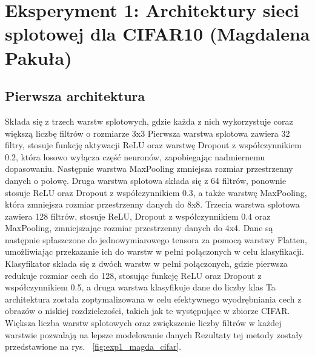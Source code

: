 \documentclass[10pt]{article}
\begin{document}
\pagebreak
\section{Eksperyment 1: Architektury sieci splotowej dla CIFAR10 (Magdalena Pakuła)}\label{sec:ex1-pakula_cifar}

\subsection*{Pierwsza architektura}
Składa się z trzech warstw splotowych, gdzie każda z nich wykorzystuje coraz większą liczbę filtrów o rozmiarze 3x3
Pierwsza warstwa splotowa zawiera 32 filtry, stosuje funkcję aktywacji ReLU oraz warstwę Dropout z współczynnikiem 0.2, która losowo wyłącza część neuronów, zapobiegając nadmiernemu dopasowaniu. Następnie warstwa MaxPooling zmniejsza rozmiar przestrzenny danych o połowę. Druga warstwa splotowa składa się z 64 filtrów, ponownie stosuje ReLU oraz Dropout z współczynnikiem 0.3, a także warstwę MaxPooling, która zmniejsza rozmiar przestrzenny danych do 8x8. Trzecia warstwa splotowa zawiera 128 filtrów, stosuje ReLU, Dropout z współczynnikiem 0.4 oraz MaxPooling, zmniejszając rozmiar przestrzenny danych do 4x4. Dane są następnie spłaszczone do jednowymiarowego tensora za pomocą warstwy Flatten, umożliwiając przekazanie ich do warstw w pełni połączonych w celu klasyfikacji. Klasyfikator składa się z dwóch warstw w pełni połączonych, gdzie pierwsza redukuje rozmiar cech do 128, stosując funkcję ReLU oraz Dropout z współczynnikiem 0.5, a druga warstwa klasyfikuje dane do liczby klas
Ta architektura została zoptymalizowana w celu efektywnego wyodrębniania cech z obrazów o niskiej rozdzielczości, takich jak te występujące w zbiorze CIFAR. Większa liczba warstw splotowych oraz zwiększenie liczby filtrów w każdej warstwie pozwalają na lepsze modelowanie danych
Rezultaty tej metody zostały przedstawione na rys. ~\ref{fig:exp1_magda_cifar}.

\MagdaCifarLarge{}
\end{document}
